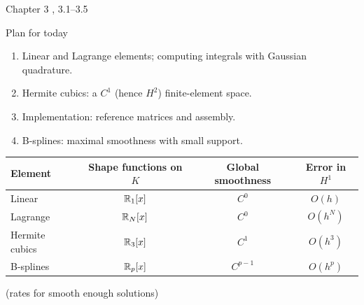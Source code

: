 
{Chapter 3}
{,
    }
{3.1--3.5}

\begin{frame}{Plan for today}
    \begin{enumerate}
        \item Linear and Lagrange elements; computing integrals with Gaussian quadrature.
        \item Hermite cubics: a $C^1$ (hence $H^2$) finite-element space.
        \item Implementation: reference matrices and assembly.
        \item B-splines: maximal smoothness with small support.
    \end{enumerate}
    \bigskip
    \begin{center}
        \begin{tabular}{@{}lccc@{}}
            \toprule
            Element        & Shape functions on $K$ & Global smoothness & Error in $H^1$ \\
            \midrule
            Linear         & ${\mathbb R}_1[x]$              & $C^0$             & $O(h)$         \\
            Lagrange       & ${\mathbb R}_N[x]$              & $C^0$             & $O(h^N)$       \\
            Hermite cubics & ${\mathbb R}_3[x]$              & $C^1$             & $O(h^3)$       \\
            B-splines      & ${\mathbb R}_p[x]$              & $C^{p-1}$         & $O(h^p)$       \\
            \bottomrule
        \end{tabular}
    \end{center}
    {\small (rates for smooth enough solutions)}
\end{frame}


